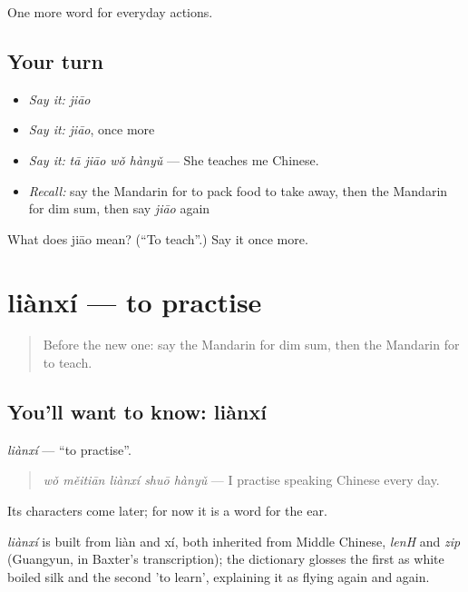 \begin{grammarlens}[title={What you've built}]
One more word for everyday actions.
\end{grammarlens}

\subsection*{Your turn}
\begin{itemize}
\raggedright
  \item \emph{Say it:} \emph{jiāo}
  \item \emph{Say it:} \emph{jiāo}, once more
  \item \emph{Say it:} \emph{tā jiāo wǒ hànyǔ} — She teaches me Chinese.
  \item \emph{Recall:} say the Mandarin for to pack food to take away, then the Mandarin for dim sum, then say \emph{jiāo} again
\end{itemize}

\begin{tcolorbox}[breakable,colback=teal!4,colframe=teal!35!black,title={Before you move on}]
What does jiāo mean? (\textquotedblleft{}To teach\textquotedblright{}.) Say it once more.
\end{tcolorbox}
\section[liànxí]{liànxí — to practise}

\label{lesson:ZH-C121-lianxi}



\begin{quote}
Before the new one: say the Mandarin for dim sum, then the Mandarin for to teach.
\end{quote}

\subsection*{You'll want to know: liànxí}
\emph{liànxí} — \textquotedblleft{}to practise\textquotedblright{}.

\begin{quote}
\emph{wǒ měitiān liànxí shuō hànyǔ} — I practise speaking Chinese every day.
\end{quote}

Its characters come later; for now it is a word for the ear.

\begin{cousinweb}
\emph{liànxí} is built from liàn and xí, both inherited from Middle Chinese, \emph{lenH} and \emph{zip} (Guangyun, in Baxter's transcription); the dictionary glosses the first as white boiled silk and the second 'to learn', explaining it as flying again and again.
\end{cousinweb}

